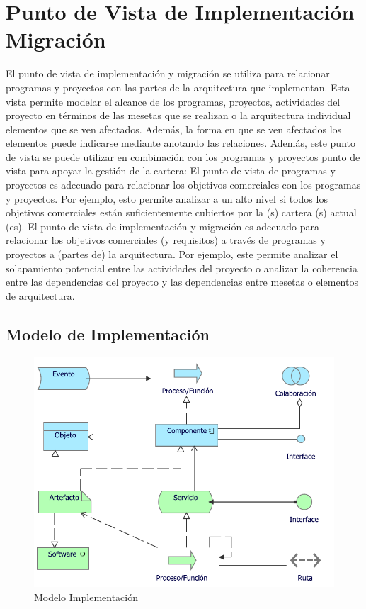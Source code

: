 \section{Punto de Vista de Implementación Migración}

El punto de vista de implementación y migración se utiliza para relacionar programas y proyectos con las partes de la arquitectura que implementan.  Esta vista permite modelar el alcance de los programas, proyectos, actividades del proyecto en términos de las mesetas que se realizan o la arquitectura individual elementos que se ven afectados.  Además, la forma en que se ven afectados los elementos puede indicarse mediante anotando las relaciones.
Además, este punto de vista se puede utilizar en combinación con los programas y proyectos
punto de vista para apoyar la gestión de la cartera:
El punto de vista de programas y proyectos es adecuado para relacionar los objetivos comerciales con los programas y
proyectos.  Por ejemplo, esto permite analizar a un alto nivel si todos
los objetivos comerciales están suficientemente cubiertos por la (s) cartera (s) actual (es).
El punto de vista de implementación y migración es adecuado para relacionar los objetivos comerciales (y
requisitos) a través de programas y proyectos a (partes de) la arquitectura.  Por ejemplo, este
permite analizar el solapamiento potencial entre las actividades del proyecto o analizar la coherencia entre las dependencias del proyecto y las dependencias entre mesetas o
elementos de arquitectura.

\subsection{Modelo de Implementación}
\begin{figure}[h!]
	\centering
	\includegraphics[width=.7\linewidth]{imgs/modelo/Implementacion.pdf}
	\caption{Modelo Implementación}
\end{figure}

